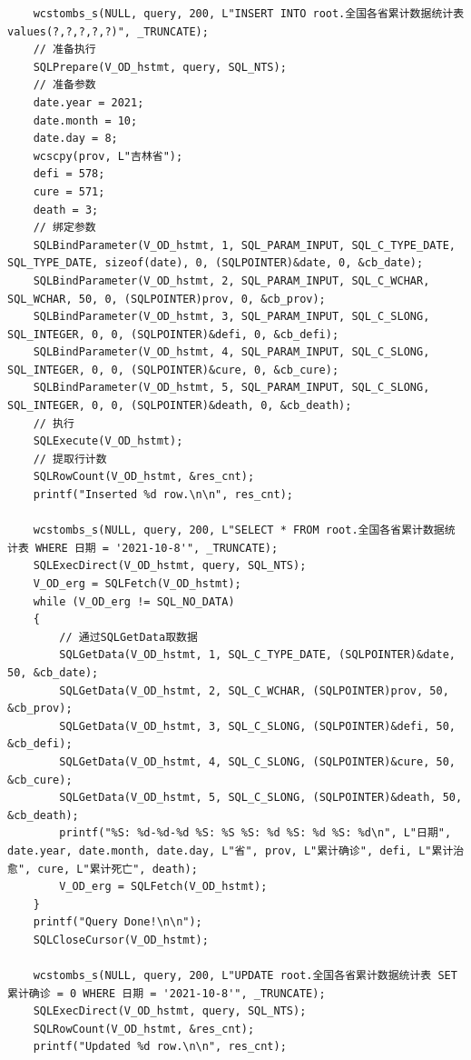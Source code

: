\documentclass[lang=cn,11pt,a4paper,cite=authornum]{paper}
\begin{document}
\begin{code}
\begin{verbatim}
    wcstombs_s(NULL, query, 200, L"INSERT INTO root.全国各省累计数据统计表 values(?,?,?,?,?)", _TRUNCATE);
    // 准备执行
    SQLPrepare(V_OD_hstmt, query, SQL_NTS);
    // 准备参数
    date.year = 2021;
    date.month = 10;
    date.day = 8;
    wcscpy(prov, L"吉林省");
    defi = 578;
    cure = 571;
    death = 3;
    // 绑定参数
    SQLBindParameter(V_OD_hstmt, 1, SQL_PARAM_INPUT, SQL_C_TYPE_DATE, SQL_TYPE_DATE, sizeof(date), 0, (SQLPOINTER)&date, 0, &cb_date);
    SQLBindParameter(V_OD_hstmt, 2, SQL_PARAM_INPUT, SQL_C_WCHAR, SQL_WCHAR, 50, 0, (SQLPOINTER)prov, 0, &cb_prov);
    SQLBindParameter(V_OD_hstmt, 3, SQL_PARAM_INPUT, SQL_C_SLONG, SQL_INTEGER, 0, 0, (SQLPOINTER)&defi, 0, &cb_defi);
    SQLBindParameter(V_OD_hstmt, 4, SQL_PARAM_INPUT, SQL_C_SLONG, SQL_INTEGER, 0, 0, (SQLPOINTER)&cure, 0, &cb_cure);
    SQLBindParameter(V_OD_hstmt, 5, SQL_PARAM_INPUT, SQL_C_SLONG, SQL_INTEGER, 0, 0, (SQLPOINTER)&death, 0, &cb_death);
    // 执行
    SQLExecute(V_OD_hstmt);
    // 提取行计数
    SQLRowCount(V_OD_hstmt, &res_cnt);
    printf("Inserted %d row.\n\n", res_cnt);

    wcstombs_s(NULL, query, 200, L"SELECT * FROM root.全国各省累计数据统计表 WHERE 日期 = '2021-10-8'", _TRUNCATE);
    SQLExecDirect(V_OD_hstmt, query, SQL_NTS);
    V_OD_erg = SQLFetch(V_OD_hstmt);
    while (V_OD_erg != SQL_NO_DATA)
    {
        // 通过SQLGetData取数据
        SQLGetData(V_OD_hstmt, 1, SQL_C_TYPE_DATE, (SQLPOINTER)&date, 50, &cb_date);
        SQLGetData(V_OD_hstmt, 2, SQL_C_WCHAR, (SQLPOINTER)prov, 50, &cb_prov);
        SQLGetData(V_OD_hstmt, 3, SQL_C_SLONG, (SQLPOINTER)&defi, 50, &cb_defi);
        SQLGetData(V_OD_hstmt, 4, SQL_C_SLONG, (SQLPOINTER)&cure, 50, &cb_cure);
        SQLGetData(V_OD_hstmt, 5, SQL_C_SLONG, (SQLPOINTER)&death, 50, &cb_death);
        printf("%S: %d-%d-%d %S: %S %S: %d %S: %d %S: %d\n", L"日期", date.year, date.month, date.day, L"省", prov, L"累计确诊", defi, L"累计治愈", cure, L"累计死亡", death);
        V_OD_erg = SQLFetch(V_OD_hstmt);
    }
    printf("Query Done!\n\n");
    SQLCloseCursor(V_OD_hstmt);

    wcstombs_s(NULL, query, 200, L"UPDATE root.全国各省累计数据统计表 SET 累计确诊 = 0 WHERE 日期 = '2021-10-8'", _TRUNCATE);
    SQLExecDirect(V_OD_hstmt, query, SQL_NTS);
    SQLRowCount(V_OD_hstmt, &res_cnt);
    printf("Updated %d row.\n\n", res_cnt);


\end{verbatim}
\end{code}
\end{document}
